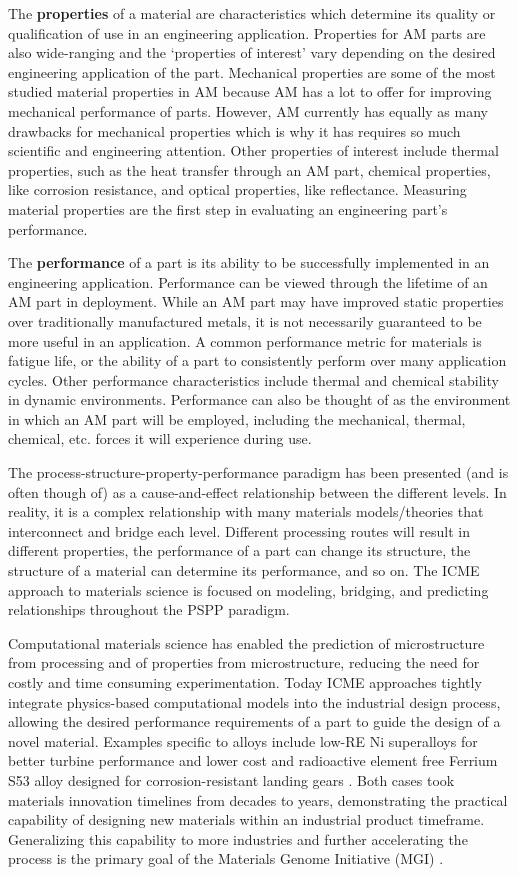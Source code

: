 The \textbf{properties} of a material are characteristics which determine its quality or qualification of use in an engineering application. Properties for AM parts are also wide-ranging and the `properties of interest' vary depending on the desired engineering application of the part. Mechanical properties are some of the most studied material properties in AM because AM has a lot to offer for improving mechanical performance of parts. However, AM currently has equally as many drawbacks for mechanical properties which is why it has requires so much scientific and engineering attention. Other properties of interest include thermal properties, such as the heat transfer through an AM part, chemical properties, like corrosion resistance, and optical properties, like reflectance. Measuring material properties are the first step in evaluating an engineering part's performance.

The \textbf{performance} of a part is its ability to be successfully implemented in an engineering application. Performance can be viewed through the lifetime of an AM part in deployment. While an AM part may have improved static properties over traditionally manufactured metals, it is not necessarily guaranteed to be more useful in an application. A common performance metric for materials is fatigue life, or the ability of a part to consistently perform over many application cycles. Other performance characteristics include thermal and chemical stability in dynamic environments. Performance can also be thought of as the environment in which an AM part will be employed, including the mechanical, thermal, chemical, etc. forces it will experience during use.

The process-structure-property-performance paradigm has been presented (and is often though of) as a cause-and-effect relationship between the different levels. In reality, it is a complex relationship with many materials models/theories that interconnect and bridge each level. Different processing routes will result in different properties, the performance of a part can change its structure, the structure of a material can determine its performance, and so on. The ICME approach to materials science is focused on modeling, bridging, and predicting relationships throughout the PSPP paradigm.

Computational materials science has enabled the prediction of microstructure from processing and of properties from microstructure, reducing the need for costly and time consuming experimentation. Today ICME approaches tightly integrate physics-based computational models into the industrial design process, allowing the desired performance requirements of a part to guide the design of a novel material. Examples specific to alloys include low-RE Ni superalloys for better turbine performance \cite{Pollock2016} and lower cost and radioactive element free Ferrium S53 alloy designed for corrosion-resistant landing gears \cite{Olson2014}. Both cases took materials innovation timelines from decades to years, demonstrating the practical capability of designing new materials within an industrial product timeframe. Generalizing this capability to more industries and further accelerating the process is the primary goal of the Materials Genome Initiative (MGI) \cite{MGI}.

